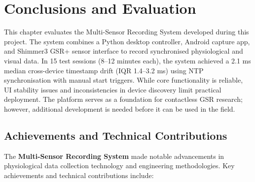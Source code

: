 \chapter{Conclusions and Evaluation}

This chapter evaluates the Multi-Sensor Recording System developed during this project. The system combines a Python desktop controller, Android capture app, and Shimmer3 GSR+ sensor interface to record synchronised physiological and visual data. In 15 test sessions (8--12 minutes each), the system achieved a 2.1 ms median cross-device timestamp drift (IQR 1.4--3.2 ms) using NTP synchronisation with manual start triggers. While core functionality is reliable, UI stability issues and inconsistencies in device discovery limit practical deployment. The platform serves as a foundation for contactless GSR research; however, additional development is needed before it can be used in the field.

\section{Achievements and Technical Contributions}

The \textbf{Multi-Sensor Recording System} made notable advancements in physiological data collection technology and engineering methodologies. Key achievements and technical contributions include:

